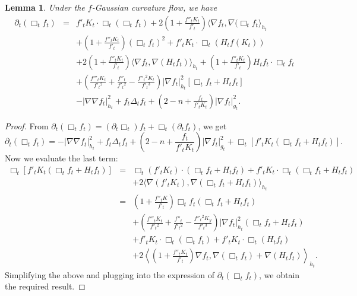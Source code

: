 \documentclass{amsart}
\newtheorem{lemma}[theorem]{Lemma}
\theoremstyle{definition}
\theoremstyle{remark}
\numberwithin{equation}{section}
\begin{document}
\begin{lemma} \label{l3.1}Under the $f$-Gaussian curvature flow, we have
\begin{eqnarray}
\partial_{t}\left(\Box_{t} f_{t}\right)&=&f'_{t}K_{t}\cdot\Box_{t}(\Box_{t}
 f_{t})+2\left(1+
\frac{f''_{t}K_{t}}{f'_{t}}\right)\langle\nabla f_{t},\nabla(\Box_{t} f_{t}\rangle_{h_{t}}\nonumber\\
&&+\left(1+\frac{f''_{t}K_{t}}{f'_{t}}\right)(\Box_{t} f_{t})^{2}+f'_{t}K_{t}\cdot\Box_{t}(H_{t}f(K_{t}))\nonumber\\
&&+2\left(1+\frac{f''_{t}K_{t}}{f'_{t}}\right)\langle\nabla f_{t},\nabla(H_{t}f_{t})\rangle_{h_{t}}+\left(1
+\frac{f''_{t}K_{t}}{f'_{t}}\right)H_{t}f_{t}\cdot\Box_{t} f_{t}\label{3.7}\\
&&+\left(\frac{f'''_{t}K_{t}}{f'_{t}{}^{2}}
+\frac{f''_{t}}{f'_{t}{}^{2}}-\frac{f''_{t}{}^{2}K_{t}}{f'_{t}{}^{3}}
\right)
|\nabla f_{t}|^{2}_{h_{t}}\left[\Box_{t} f_{t}+H_{t}f_{t}\right]\nonumber\\
&&-|\nabla\nabla f_{t}|^{2}_{h_{t}}+f_{t}\Delta_{t} f_{t}+\left(2-n+\frac{f_{t}}{f'_{t}K_{t}}\right)|\nabla f_{t}|^{2}_{g_{t}}.\nonumber
\end{eqnarray}
\end{lemma}

\begin{proof} From $\partial_{t}(\Box_{t} f_{t})=\left(\partial_{t}\Box_{t}
\right)f_{t}+\Box_{t}\left(\partial_{t}f_{t}\right)$, we get
\begin{equation*}
\partial_{t}(\Box_{t} f_{t})=-|\nabla\nabla f_{t}|^{2}_{h_{t}}
+f_{t}\Delta_{t} f_{t}+\left(2-n+\frac{f_{t}}{f'_{t}K_{t}}\right)|\nabla f_{t}|^{2}_{g_{t}}+\Box_{t}\left[f'_{t}K_{t}(\Box_{t} f_{t}+H_{t}
f_{t})\right].
\end{equation*}
Now we evaluate the last term:
\begin{eqnarray*}
\Box_{t}\left[f'_{t}K_{t}(\Box_{t} f_{t}+H_{t}f_{t})\right]&=&\Box_{t}(f'_{t}K_{t})\cdot(\Box_{t} f_{t}+H_{t}f_{t})+f'_{t}K_{t}\cdot\Box_{t}(\Box_{t} f_{t}+H_{t}f_{t})\\
&&+2\langle\nabla(f'_{t}K_{t}),\nabla(\Box_{t} f_{t}+H_{t}f_{t})\rangle_{h_{t}}\\
&=&\left(1+\frac{f''_{t}K}{f'_{t}}\right)\Box_{t} f_{t}\left(\Box_{t}f_{t}+H_{t}f_{t}\right)\\
&&+\left(\frac{f'''_{t}K_{t}}{f'_{t}{}^{2}}
+\frac{f''_{t}}{f'_{t}{}^{2}}-\frac{f''_{t}{}^{2}K_{y}}{f'_{t}{}^{3}}
\right)|\nabla f_{t}|^{2}_{h_{t}}(\Box_{t} f_{t}+H_{t}f_{t})\\
&&+f'_{t}K_{t}\cdot\Box_{t}(\Box_{t} f_{t})+f'_{t}K_{t}\cdot\Box_{t}(H_{t}f_{t})\\
&&+2\left\langle\left(1+\frac{f''_{t}K_{t}}{f'_{t}}\right)\nabla f_{t},
\nabla(\Box_{t} f_{t})+\nabla(H_{t}f_{t})\right\rangle_{h_{t}}.
\end{eqnarray*}
Simplifying the above and plugging into the expression of
$\partial_{t}(\Box_{t} f_{t})$, we obtain the required result.
\end{proof}
\end{document}

